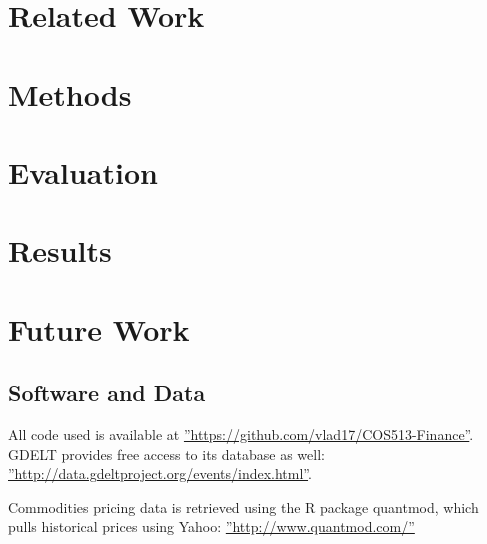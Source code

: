 \documentclass{article}
\begin{document}
\section{Related Work}



\section{Methods}


\section{Evaluation}


\section{Results}



\section{Future Work}


\subsection{Software and Data}

All code used is available at \hyperref[https://github.com/vlad17/COS513-Finance]{''https://github.com/vlad17/COS513-Finance''}. GDELT provides free access to its database as well: \hyperref[http://data.gdeltproject.org/events/index.html]{''http://data.gdeltproject.org/events/index.html''}.

Commodities pricing data is retrieved using the R package quantmod, which pulls historical prices using Yahoo: \hyperref[http://www.quantmod.com/]{''http://www.quantmod.com/''}





\end{document}
